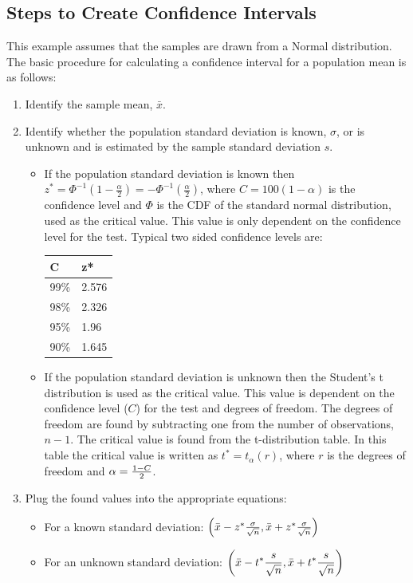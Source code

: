 \documentclass{tufte-handout}\usepackage[]{graphicx}\usepackage[]{color}
\begin{document}
\subsection{Steps to Create Confidence Intervals}
This example assumes that the samples are drawn from a Normal distribution. The basic procedure for calculating a confidence interval for a population mean is as follows:
\begin{enumerate}
  \item Identify the sample mean, $\bar{x}$.
  
  \item Identify whether the population standard deviation is known, $\sigma$, or is unknown and is estimated by the sample standard deviation $s$.
  
  \begin{itemize}
    \item If the population standard deviation is known then $z^{*}=\Phi ^{-1}\left(1-{\frac {\alpha }{2}}\right)=-\Phi ^{-1}\left({\frac {\alpha }{2}}\right)$, where $C=100(1-\alpha)$ is the confidence level and $\Phi$  is the CDF of the standard normal distribution, used as the critical value. This value is only dependent on the confidence level for the test. Typical two sided confidence levels are:
    
\begin{table}
\begin{tabular}{ll}
C	    & z* \\ \hline
99\%	  & 2.576 \\
98\%	  & 2.326 \\
95\%	  & 1.96 \\
90\%	  & 1.645 \\
\end{tabular}
\end{table}

\item If the population standard deviation is unknown then the Student's t distribution is used as the critical value. This value is dependent on the confidence level ($C$) for the test and degrees of freedom. The degrees of freedom are found by subtracting one from the number of observations, $n − 1$. The critical value is found from the t-distribution table. In this table the critical value is written as $t^{*}=t_{\alpha }(r)$, where $r$ is the degrees of freedom and $\alpha ={1-C \over 2}$.

  \end{itemize}

\item Plug the found values into the appropriate equations:

\begin{itemize}
  \item For a known standard deviation: $\left({\bar {x}}-z^{*}{\sigma \over {\sqrt {n}}},{\bar {x}}+z^{*}{\sigma \over {\sqrt {n}}}\right)$

  \item For an unknown standard deviation: $\displaystyle \left({\bar {x}}-t^{*}{s \over {\sqrt {n}}},{\bar {x}}+t^{*}{s \over {\sqrt {n}}}\right)$
\end{itemize}

\end{enumerate}
\end{document}
